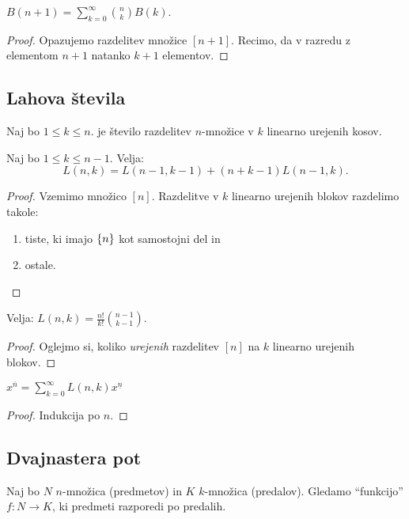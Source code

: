 \begin{trditev}
    $B(n+1) = \sum_{k=0}^{\infty} \binom{n}{k} B(k)$.
\end{trditev}

\begin{proof}
    Opazujemo razdelitev množice \([n+1]\). Recimo, da v razredu z elementom \(n+1\) natanko \(k+1\) elementov.
\end{proof}

\newpage
\subsection{Lahova števila}
\begin{definicija}
    Naj bo $1 \leq k \leq n$.  je število razdelitev $n$-množice v $k$ linearno urejenih kosov.
\end{definicija}

\begin{trditev}
    Naj bo \(1 \leq k \leq n - 1\). Velja: 
    \[L(n, k) = L(n - 1, k - 1) + (n + k - 1)L(n - 1, k).\]
\end{trditev}

\begin{proof}
    Vzemimo množico $[n]$. Razdelitve v $k$ linearno urejenih blokov razdelimo takole:
    \begin{enumerate}
        \item tiste, ki imajo $\left\{n\right\}$ kot samostojni del in
        \item ostale. \qedhere
    \end{enumerate}
\end{proof}

\begin{trditev}
    Velja: \(L(n,k) = \frac{n!}{k!} \binom{n-1}{k-1}\).
\end{trditev}

\begin{proof}
    Oglejmo si, koliko \emph{urejenih} razdelitev \([n]\) na \(k\) linearno urejenih blokov.
\end{proof}

\begin{trditev}
    \(x^{\overline{n}} = \sum_{k=0}^{\infty} L(n,k)x^{\underline{n}}\)
\end{trditev}

\begin{proof}
    Indukcija po \(n\).
\end{proof}

\subsection{Dvajnastera pot}
Naj bo $N$ $n$-množica (predmetov) in $K$ $k$-množica (predalov). 
Gledamo "`funkcijo"' $f: N \to K$, ki predmeti razporedi po predalih.

